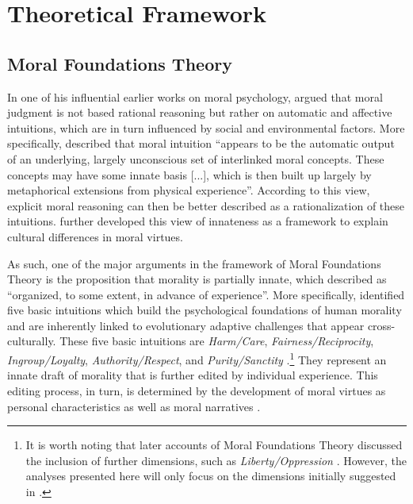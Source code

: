 \documentclass[12pt]{article}
\begin{document}
\section{Theoretical Framework}

\subsection{Moral Foundations Theory}

In one of his influential earlier works on moral psychology, \citet{haidt2001emotional} argued that moral judgment is not based rational reasoning but rather on automatic and affective intuitions, which are in turn influenced by social and environmental factors. More specifically, \citet[825]{haidt2001emotional} described that moral intuition ``appears to be the automatic output of an underlying, largely unconscious set of interlinked moral concepts. These concepts may have some innate basis [...], which is then built up largely by metaphorical extensions from physical experience''. According to this view, explicit moral reasoning can then be better described as a rationalization of these intuitions. \citet{haidt2004intuitive} further developed this view of innateness as a framework to explain cultural differences in moral virtues.

As such, one of the major arguments in the framework of Moral Foundations Theory is the proposition that morality is partially innate, which \citet[367]{haidt2008moral} described as ``organized, to some extent, in advance of experience''. More specifically, \citet{haidt2008moral} identified five basic intuitions which build the psychological foundations of human morality and are inherently linked to evolutionary adaptive challenges that appear cross-culturally. These five basic intuitions are \textit{Harm/Care}, \textit{Fairness/Reciprocity}, \textit{Ingroup/Loyalty}, \textit{Authority/Respect}, and \textit{Purity/Sanctity} \citep[see also][]{graham2011mapping}.\footnote{It is worth noting that later accounts of Moral Foundations Theory discussed the inclusion of further dimensions, such as \textit{Liberty/Oppression} \citep[c.f.][]{graham2013moral,haidt2012righteous}. However, the analyses presented here will only focus on the dimensions initially suggested in \citet{haidt2008moral}.} They represent an innate draft of morality that is further edited by individual experience. This editing process, in turn, is determined by the development of moral virtues as personal characteristics as well as moral narratives \citep{haidt2008moral}.
\end{document}
